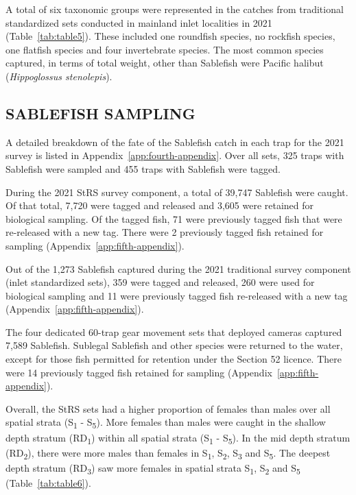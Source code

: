 \documentclass[12pt]{article}\usepackage[]{graphicx}\usepackage[]{color}
\begin{document}
A total of six taxonomic groups were represented in the catches from traditional standardized sets conducted in mainland inlet localities in 2021 (Table~\ref{tab:table5}). These included one roundfish species, no rockfish species, one flatfish species and four invertebrate species. The most common species captured, in terms of total weight, other than Sablefish were Pacific halibut (\emph{Hippoglossus stenolepis}).

\hypertarget{sablefish-sampling}{%
\subsection{SABLEFISH SAMPLING}\label{sablefish-sampling}}

A detailed breakdown of the fate of the Sablefish catch in each trap for the 2021 survey is listed in Appendix~\ref{app:fourth-appendix}. Over all sets, 325 traps with Sablefish were sampled and 455 traps with Sablefish were tagged.

During the 2021 StRS survey component, a total of 39,747 Sablefish were caught. Of that total, 7,720 were tagged and released and 3,605 were retained for biological sampling. Of the tagged fish, 71 were previously tagged fish that were re-released with a new tag. There were 2 previously tagged fish retained for sampling (Appendix~\ref{app:fifth-appendix}).

Out of the 1,273 Sablefish captured during the 2021 traditional survey component (inlet standardized sets), 359 were tagged and released, 260 were used for biological sampling and 11 were previously tagged fish re-released with a new tag (Appendix~\ref{app:fifth-appendix}).

The four dedicated 60-trap gear movement sets that deployed cameras captured 7,589 Sablefish. Sublegal Sablefish and other species were returned to the water, except for those fish permitted for retention under the Section 52 licence. There were 14 previously tagged fish retained for sampling (Appendix~\ref{app:fifth-appendix}).

Overall, the StRS sets had a higher proportion of females than males over all spatial strata (S\textsubscript{1} - S\textsubscript{5}). More females than males were caught in the shallow depth stratum (RD\textsubscript{1}) within all spatial strata (S\textsubscript{1} - S\textsubscript{5}). In the mid depth stratum (RD\textsubscript{2}), there were more males than females in S\textsubscript{1}, S\textsubscript{2}, S\textsubscript{3} and S\textsubscript{5}. The deepest depth stratum (RD\textsubscript{3}) saw more females in spatial strata S\textsubscript{1}, S\textsubscript{2} and S\textsubscript{5} (Table~\ref{tab:table6}).
\end{document}
